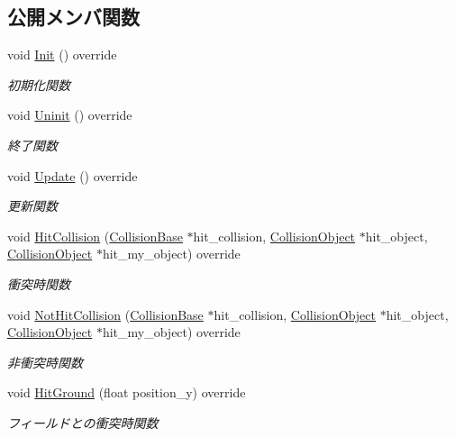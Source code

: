 \subsection*{公開メンバ関数}
\begin{DoxyCompactItemize}
\item 
void \mbox{\hyperlink{class_player_collision_a3dd6238b75933fd60aee77e92353cc44}{Init}} () override
\begin{DoxyCompactList}\small\item\em 初期化関数 \end{DoxyCompactList}\item 
void \mbox{\hyperlink{class_player_collision_aa1ab60a62fa2ae3231a1ea0bc8faf801}{Uninit}} () override
\begin{DoxyCompactList}\small\item\em 終了関数 \end{DoxyCompactList}\item 
void \mbox{\hyperlink{class_player_collision_a09f97f220903f5724a3af6b97af3a336}{Update}} () override
\begin{DoxyCompactList}\small\item\em 更新関数 \end{DoxyCompactList}\item 
void \mbox{\hyperlink{class_player_collision_ad937a5fd226e742270202bf4eff53767}{Hit\+Collision}} (\mbox{\hyperlink{class_collision_base}{Collision\+Base}} $\ast$hit\+\_\+collision, \mbox{\hyperlink{class_collision_object}{Collision\+Object}} $\ast$hit\+\_\+object, \mbox{\hyperlink{class_collision_object}{Collision\+Object}} $\ast$hit\+\_\+my\+\_\+object) override
\begin{DoxyCompactList}\small\item\em 衝突時関数 \end{DoxyCompactList}\item 
void \mbox{\hyperlink{class_player_collision_a21b8f825ea142024212ab5fe3f427ab0}{Not\+Hit\+Collision}} (\mbox{\hyperlink{class_collision_base}{Collision\+Base}} $\ast$hit\+\_\+collision, \mbox{\hyperlink{class_collision_object}{Collision\+Object}} $\ast$hit\+\_\+object, \mbox{\hyperlink{class_collision_object}{Collision\+Object}} $\ast$hit\+\_\+my\+\_\+object) override
\begin{DoxyCompactList}\small\item\em 非衝突時関数 \end{DoxyCompactList}\item 
void \mbox{\hyperlink{class_player_collision_a3522ce17b1e1752f2737c2243582ecb0}{Hit\+Ground}} (float position\+\_\+y) override
\begin{DoxyCompactList}\small\item\em フィールドとの衝突時関数 \end{DoxyCompactList}\end{DoxyCompactItemize}


